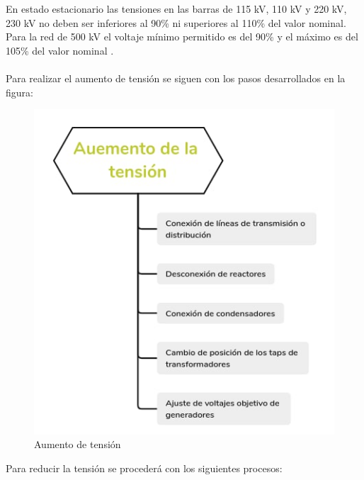 \documentclass[a5paper]{book}%
\begin{document}
En estado estacionario las tensiones en las barras de 115 kV,
  110 kV y 220 kV, 230 kV no deben ser inferiores al 90\% ni
  superiores al 110\% del valor nominal. Para la red de 500 kV el
  voltaje mínimo permitido es del 90\% y el máximo es del 105\% del
  valor nominal \cite{CREG0251995}.\\\\

Para realizar el aumento de tensión se siguen con los pasos desarrollados en la figura:

\begin{figure}[H]
  \centering
  \caption{Aumento de tensión}
  \label{fig:aumentotension}
  \includegraphics[width=0.8\linewidth]{aumentartension}
\end{figure}

Para reducir la tensión se procederá con los siguientes procesos:
\end{document}
